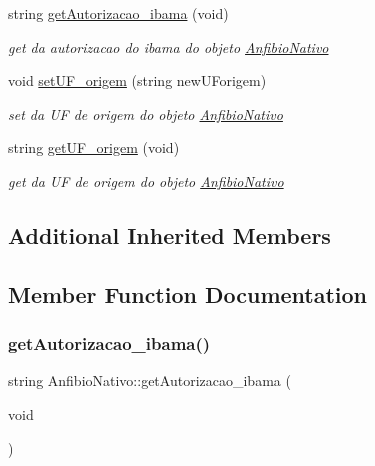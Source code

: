 \begin{DoxyCompactItemize}
string \mbox{\hyperlink{class_anfibio_nativo_afc8d72085fb2b69d20e6d018bf57ab47}{get\+Autorizacao\+\_\+ibama}} (void)
\begin{DoxyCompactList}\small\item\em get da autorizacao do ibama do objeto \mbox{\hyperlink{class_anfibio_nativo}{Anfibio\+Nativo}} \end{DoxyCompactList}\item 
void \mbox{\hyperlink{class_anfibio_nativo_a6c09318140be35947cab0810d21d3af0}{set\+U\+F\+\_\+origem}} (string new\+U\+Forigem)
\begin{DoxyCompactList}\small\item\em set da UF de origem do objeto \mbox{\hyperlink{class_anfibio_nativo}{Anfibio\+Nativo}} \end{DoxyCompactList}\item 
string \mbox{\hyperlink{class_anfibio_nativo_a8bb0d0aad8d6a61a1accb9519cfbe10e}{get\+U\+F\+\_\+origem}} (void)
\begin{DoxyCompactList}\small\item\em get da UF de origem do objeto \mbox{\hyperlink{class_anfibio_nativo}{Anfibio\+Nativo}} \end{DoxyCompactList}\end{DoxyCompactItemize}
\subsection*{Additional Inherited Members}


\subsection{Member Function Documentation}
\mbox{\label{class_anfibio_nativo_afc8d72085fb2b69d20e6d018bf57ab47}} 
\subsubsection{\texorpdfstring{getAutorizacao\_ibama()}{getAutorizacao\_ibama()}}
{\footnotesize\ttfamily string Anfibio\+Nativo\+::get\+Autorizacao\+\_\+ibama (\begin{DoxyParamCaption}\item[{void}]{ }\end{DoxyParamCaption})\hspace{0.3cm}{\ttfamily [virtual]}}




